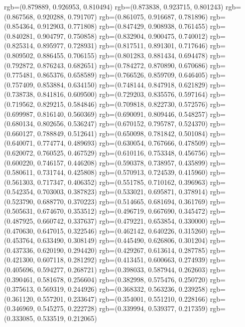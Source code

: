 {{{					rgb=(0.879889, 0.926953, 0.810494)
					rgb=(0.873838, 0.923715, 0.801243)
					rgb=(0.867568, 0.920288, 0.791707)
					rgb=(0.861075, 0.916687, 0.781896)
					rgb=(0.854364, 0.912903, 0.771808)
					rgb=(0.847429, 0.908938, 0.761455)
					rgb=(0.840281, 0.904797, 0.750858)
					rgb=(0.832904, 0.900475, 0.740012)
					rgb=(0.825314, 0.895977, 0.728931)
					rgb=(0.817511, 0.891301, 0.717646)
					rgb=(0.809502, 0.886455, 0.706155)
					rgb=(0.801283, 0.881434, 0.694478)
					rgb=(0.792872, 0.876243, 0.682651)
					rgb=(0.784272, 0.870890, 0.670686)
					rgb=(0.775481, 0.865376, 0.658589)
					rgb=(0.766526, 0.859709, 0.646405)
					rgb=(0.757409, 0.853884, 0.634150)
					rgb=(0.748144, 0.847918, 0.621829)
					rgb=(0.738738, 0.841816, 0.609500)
					rgb=(0.729203, 0.835576, 0.597164)
					rgb=(0.719562, 0.829215, 0.584846)
					rgb=(0.709818, 0.822730, 0.572576)
					rgb=(0.699987, 0.816140, 0.560369)
					rgb=(0.690091, 0.809446, 0.548257)
					rgb=(0.680134, 0.802656, 0.536247)
					rgb=(0.670152, 0.795787, 0.524370)
					rgb=(0.660127, 0.788849, 0.512641)
					rgb=(0.650098, 0.781842, 0.501084)
					rgb=(0.640071, 0.774774, 0.489693)
					rgb=(0.630054, 0.767666, 0.478509)
					rgb=(0.620072, 0.760525, 0.467529)
					rgb=(0.610116, 0.753348, 0.456756)
					rgb=(0.600220, 0.746157, 0.446208)
					rgb=(0.590378, 0.738957, 0.435899)
					rgb=(0.580611, 0.731744, 0.425808)
					rgb=(0.570913, 0.724539, 0.415960)
					rgb=(0.561303, 0.717347, 0.406352)
					rgb=(0.551785, 0.710162, 0.396963)
					rgb=(0.542354, 0.703003, 0.387823)
					rgb=(0.533021, 0.695871, 0.378914)
					rgb=(0.523790, 0.688770, 0.370223)
					rgb=(0.514665, 0.681694, 0.361769)
					rgb=(0.505631, 0.674670, 0.353512)
					rgb=(0.496719, 0.667690, 0.345472)
					rgb=(0.487925, 0.660742, 0.337637)
					rgb=(0.479221, 0.653854, 0.330000)
					rgb=(0.470630, 0.647015, 0.322546)
					rgb=(0.462142, 0.640226, 0.315260)
					rgb=(0.453764, 0.633490, 0.308149)
					rgb=(0.445490, 0.626806, 0.301204)
					rgb=(0.437336, 0.620190, 0.294420)
					rgb=(0.429267, 0.613614, 0.287785)
					rgb=(0.421300, 0.607118, 0.281292)
					rgb=(0.413451, 0.600663, 0.274939)
					rgb=(0.405696, 0.594277, 0.268721)
					rgb=(0.398033, 0.587944, 0.262603)
					rgb=(0.390461, 0.581678, 0.256604)
					rgb=(0.382998, 0.575476, 0.250720)
					rgb=(0.375613, 0.569319, 0.244926)
					rgb=(0.368332, 0.563236, 0.239258)
					rgb=(0.361120, 0.557201, 0.233647)
					rgb=(0.354001, 0.551210, 0.228166)
					rgb=(0.346969, 0.545275, 0.222728)
					rgb=(0.339994, 0.539377, 0.217359)
					rgb=(0.333085, 0.533519, 0.212065)
}}}
